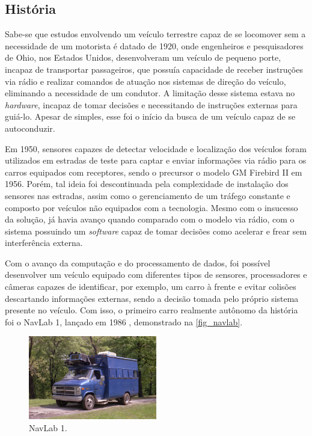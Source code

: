 \subsection{Hist{\'o}ria}

Sabe-se que estudos envolvendo um veículo terrestre capaz de se locomover sem a
necessidade de um motorista é datado de 1920, onde engenheiros e pesquisadores
de Ohio, nos Estados Unidos, desenvolveram um veículo de pequeno porte, incapaz
de transportar passageiros, que possuía capacidade de receber instruções via
rádio e realizar comandos de atuação nos sistemas de direção do veículo,
eliminando a necessidade de um condutor.  A limitação desse sistema estava no
\textit{hardware}, incapaz de tomar decisões e necessitando de instruções externas para
guiá-lo. Apesar de simples, esse foi o início da busca de um veículo capaz de
se autoconduzir. 

Em 1950, sensores capazes de detectar velocidade e localização dos veículos
foram utilizados em estradas de teste para captar e enviar informações via
rádio para os carros equipados com receptores, sendo o precursor o modelo GM
Firebird II em 1956. Porém, tal ideia foi descontinuada pela complexidade de
instalação dos sensores nas estradas, assim como o gerenciamento de um tráfego
constante e composto por veículos não equipados com a tecnologia. Mesmo com o
insucesso da solução, já havia avanço quando comparado com o modelo via rádio,
com o sistema possuindo um \textit{software} capaz de tomar decisões como acelerar e
frear sem interferência externa.

Com o avanço da computação e do processamento de dados, foi possível
desenvolver um veículo equipado com diferentes tipos de sensores, processadores
e câmeras capazes de identificar, por exemplo, um carro à frente e evitar
colisões descartando informações externas, sendo a decisão tomada pelo próprio
sistema presente no veículo. Com isso, o primeiro carro realmente autônomo da
história foi o NavLab 1, lançado em 1986 \cite{estadao2020}, demonstrado na \autoref{fig_navlab}. 

\begin{figure}[htb]
        \centering
        \caption{\label{fig_navlab}NavLab 1.}
        \includegraphics[width=0.5\textwidth]{images/EG-navlab1-CMU-media-relations.jpg}
\end{figure}

